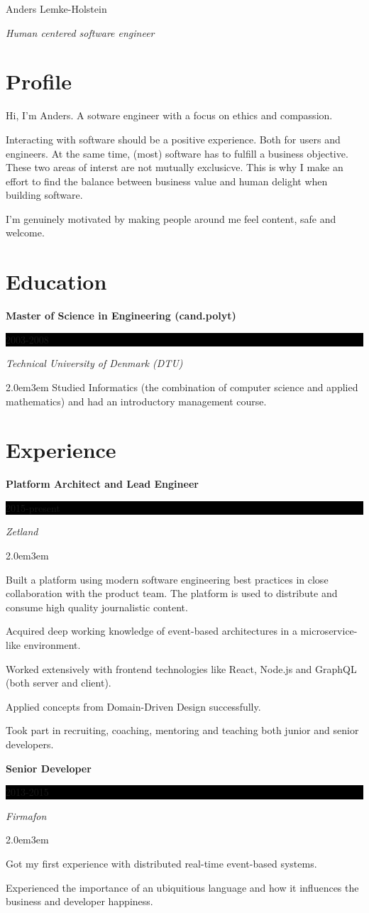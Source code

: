 \documentclass[paper=a4,fontsize=11pt]{scrartcl} %
\newcommand{\sepspace}{\vspace*{1em}}        %
\newcommand{\MyName}[1]{ %
  \begin{center}
    \Huge \usefont{OT1}{phv}{b}{n} #1
    \par \normalsize \normalfont
  \end{center}
  }
\newcommand{\MySlogan}[1]{ %
  \begin{center}
    \large \usefont{OT1}{phv}{m}{n} \textit{#1}
        \par \normalsize \normalfont
        \end{center}
        }
\newcommand{\NewPart}[1]{\section*{#1}}
\newcommand{\EducationEntry}[4]{
        \noindent \textbf{#1} \hfill      %
        \colorbox{Black}{%
            \parbox{6em}{%
            \hfill\color{White}#2}} \par  %
        \noindent \textit{#3} \par        %
        \begin{adjustwidth}{2.0em}{3em}
#4
        \end{adjustwidth}
        \sepspace
        \normalsize \par}
\begin{document}
{\selectfont

\MyName{Anders Lemke-Holstein}
\MySlogan{Human centered software engineer}

\NewPart{Profile}{}
Hi, I'm Anders. A sotware engineer with a focus on ethics and compassion.

Interacting with software should be a positive experience. Both for users and engineers. At the same time, (most) software has to fulfill a business objective. These two areas of interst are not mutually exclusicve. This is why I make an effort to find the balance between business value and human delight when building software.

I'm genuinely motivated by making people around me feel content, safe and welcome.

\NewPart{Education}{}

\EducationEntry{Master of Science in Engineering (cand.polyt)}{2003-2008}{Technical University of Denmark (DTU)}{Studied Informatics (the combination of computer science and applied mathematics) and had an introductory management course.}

\NewPart{Experience}{}

\EducationEntry{Platform Architect and Lead Engineer}{2015-present}{Zetland}{
  Built a platform using modern software engineering best practices in close collaboration with the product team. The platform is used to distribute and consume high quality journalistic content.
  
  Acquired deep working knowledge of event-based architectures in a microservice-like environment.

  Worked extensively with frontend technologies like React, Node.js and GraphQL (both server and client).

  Applied concepts from Domain-Driven Design successfully.

  Took part in recruiting, coaching, mentoring and teaching both junior and senior developers.
}

\EducationEntry{Senior Developer}{2013-2015}{Firmafon}{
  Got my first experience with distributed real-time event-based systems.

  Experienced the importance of an ubiquitious language and how it influences the business and developer happiness.

}}
\end{document}
